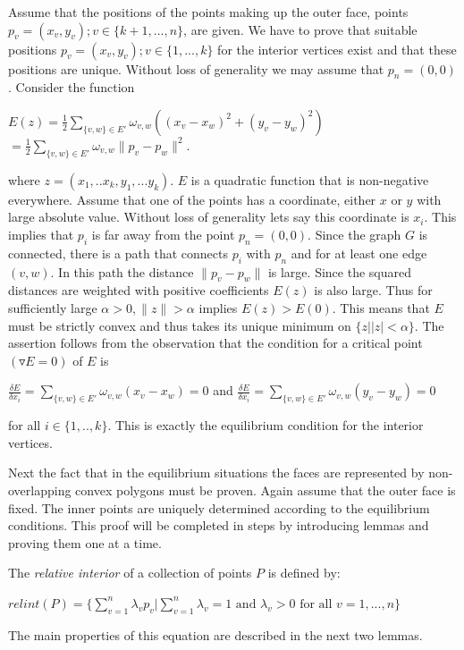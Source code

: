 \documentclass[11pt]{article}
\begin{document}
Assume that the positions of the points making up the outer face, points $p_v = (x_v,y_v); v \in \{k+1,...,n\}$, are given. We have to prove that suitable positions $p_v = (x_v,y_v); v \in \{1,...,k\}$ for the interior vertices exist and that these positions are unique. Without loss of generality we may assume that $p_n = (0,0)$. Consider the function
\begin{center}
$E(z) = \frac{1}{2} \sum\limits_{\{v,w\} \in E'} \omega_{v,w}((x_v - x_w)^2 + (y_v - y_w)^2)$ \\
$= \frac{1}{2} \sum\limits_{\{v,w\} \in E'} \omega_{v,w} \|p_v - p_w\|^2$. \\
\end{center}
where $z = (x_1,..x_k, y_1,...y_k)$.
$E$ is a quadratic function that is non-negative everywhere. Assume that one of the points has a coordinate, either $x$ or $y$ with large absolute value. Without loss of generality lets say this coordinate is $x_i$. This implies that $p_i$ is far away from the point $p_n = (0,0)$. Since the graph $G$ is connected, there is a path that connects $p_i$ with $p_n$ and for at least one edge $(v,w)$. In this path the distance $\|p_v - p_w\|$ is large. Since the squared distances are weighted with positive coefficients $E(z)$ is also large. Thus for sufficiently large $\alpha > 0, \|z\| > \alpha$ implies $E(z) > E(0)$. This means that $E$ must be strictly convex and thus takes its unique minimum on $\{z | |z| < \alpha \}$. The assertion follows from the observation that the condition for a critical point $(\triangledown E = 0)$ of $E$ is
\begin{center}
$\frac{\delta E}{\delta x_i} = \sum\limits_{\{v,w\} \in E'} \omega_{v,w}(x_v - x_w) = 0$ and $\frac{\delta E}{\delta x_i} = \sum\limits_{\{v,w\} \in E'} \omega_{v,w}(y_v - y_w) = 0$
\end{center}
for all $i \in \{1,..,k\}$. This is exactly the equilibrium condition for the interior vertices.

Next the fact that in the equilibrium situations the faces are represented by non-overlapping convex polygons must be proven. Again assume that the outer face is fixed. The inner points are uniquely determined according to the equilibrium conditions. This proof will be completed in steps by introducing lemmas and proving them one at a time.

The \emph{relative interior} of a collection of points $P$ is defined by: 
\begin{center}
$relint(P) = \{\sum_{v=1}^{n} \lambda_vp_v | \sum_{v=1}^{n}\lambda_v =1 \mbox{ and } \lambda_v > 0 \mbox{ for all } v = 1,...,n\}$
\end{center}
The main properties of this equation are described in the next two lemmas. \\
\end{document}
